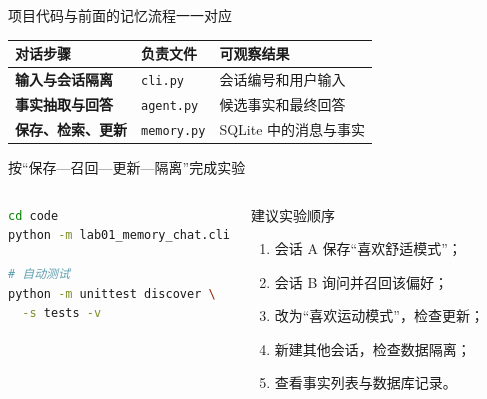 \begin{frame}{项目代码与前面的记忆流程一一对应}
  \begin{center}
  \end{center}
  \vspace{0.5em}
  \small
  \begin{tabularx}{\textwidth}{>{\bfseries}p{3.0cm} X X}
    \toprule
    对话步骤 & 负责文件 & 可观察结果 \\
    \midrule
    输入与会话隔离 & \texttt{cli.py} & 会话编号和用户输入 \\
    事实抽取与回答 & \texttt{agent.py} & 候选事实和最终回答 \\
    保存、检索、更新 & \texttt{memory.py} & SQLite 中的消息与事实 \\
    \bottomrule
  \end{tabularx}
\end{frame}

\begin{frame}[fragile]{按“保存—召回—更新—隔离”完成实验}
  \begin{columns}[T,onlytextwidth]
\begin{lstlisting}[language=bash]
cd code
python -m lab01_memory_chat.cli

# 自动测试
python -m unittest discover \
  -s tests -v
\end{lstlisting}
      \begin{block}{建议实验顺序}
        \begin{enumerate}
          \item 会话 A 保存“喜欢舒适模式”；
          \item 会话 B 询问并召回该偏好；
          \item 改为“喜欢运动模式”，检查更新；
          \item 新建其他会话，检查数据隔离；
          \item 查看事实列表与数据库记录。
        \end{enumerate}
      \end{block}
  \end{columns}
  \begin{center}
    \quad
    \quad
  \end{center}
\end{frame}

